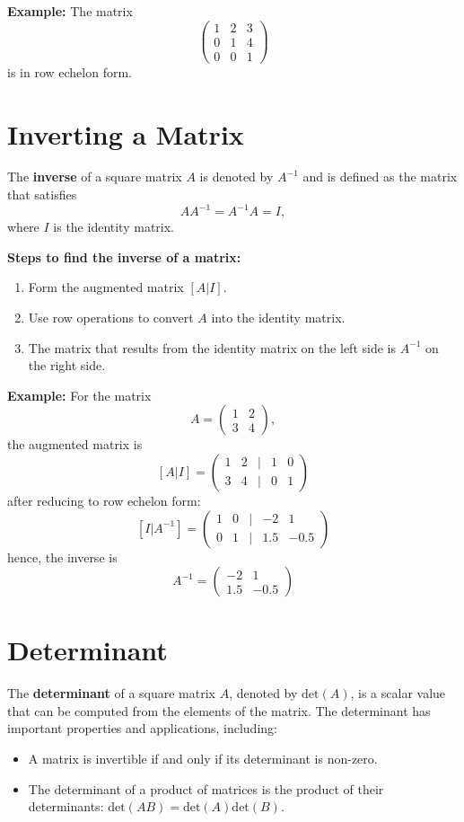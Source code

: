 \documentclass[]{article}
\begin{document}
	\textbf{Example:} The matrix
	$$
	\begin{pmatrix}
		1 & 2 & 3 \\
		0 & 1 & 4 \\
		0 & 0 & 1
	\end{pmatrix}
	$$
	is in row echelon form.
	
	\section{Inverting a Matrix}
	
	The \textbf{inverse} of a square matrix $A$ is denoted by $A^{-1}$ and is defined as the matrix that satisfies
	$$
	AA^{-1} = A^{-1}A = I,
	$$
	where $I$ is the identity matrix.
	
	\textbf{Steps to find the inverse of a matrix:}
	\begin{enumerate}
		\item Form the augmented matrix $[A | I]$.
		\item Use row operations to convert $A$ into the identity matrix.
		\item The matrix that results from the identity matrix on the left side is $A^{-1}$ on the right side.
	\end{enumerate}
	
	\textbf{Example:} For the matrix
	$$
	A = \begin{pmatrix} 1 & 2 \\ 3 & 4 \end{pmatrix},
	$$
	the augmented matrix is
	$$
	[A | I] = \begin{pmatrix}
		1 & 2 & \mid & 1 & 0\\
		3 & 4 & \mid & 0 & 1
	\end{pmatrix}
	$$
	after reducing to row echelon form:
	$$
	[I | A^{-1}] = \begin{pmatrix}
		1 & 0 & \mid & -2 & 1\\
		0 & 1 & \mid & 1.5 & -0.5
	\end{pmatrix}
	$$
	hence, the inverse is
	$$
	A^{-1} = \begin{pmatrix}
		-2 & 1\\
		1.5 & -0.5
	\end{pmatrix}
	$$
	
	\section{Determinant}
	
	The \textbf{determinant} of a square matrix $A$, denoted by $\text{det}(A)$, is a scalar value that can be computed from the elements of the matrix. The determinant has important properties and applications, including:
	\begin{itemize}
		\item A matrix is invertible if and only if its determinant is non-zero.
		\item The determinant of a product of matrices is the product of their determinants: $\text{det}(AB) = \text{det}(A)\text{det}(B)$.
	\end{itemize}
	
\end{document}
